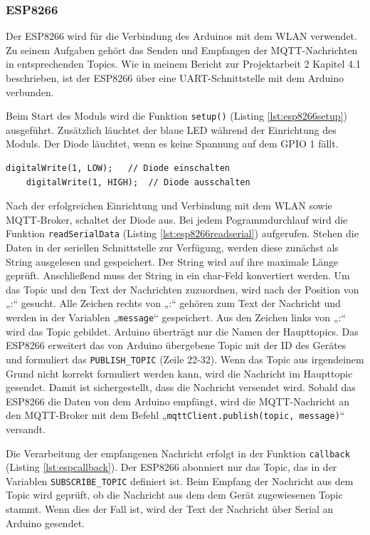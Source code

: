 \documentclass[12pt, letterpaper]{article}
\begin{document}
  \subsubsection{ESP8266}
  \par Der ESP8266 wird für die Verbindung des Arduinos mit dem WLAN verwendet. Zu seinem Aufgaben gehört das Senden und Empfangen der MQTT-Nachrichten in entsprechenden Topics. Wie in meinem Bericht zur Projektarbeit 2 \cite{pa2} Kapitel 4.1 beschrieben, ist der ESP8266 über eine UART-Schnittstelle mit dem Arduino verbunden.
  \par Beim Start des Moduls wird die Funktion \texttt{setup()} (Listing \ref{lst:esp8266setup}) ausgeführt. Zusätzlich läuchtet der blaue LED während der Einrichtung des Moduls. Der Diode läuchtet, wenn es keine Spannung auf dem GPIO 1 fällt.
  \begin{Verbatim}[frame=single]
    digitalWrite(1, LOW);   // Diode einschalten
    digitalWrite(1, HIGH);  // Diode ausschalten
  \end{Verbatim}
  \par Nach der erfolgreichen Einrichtung und Verbindung mit dem WLAN sowie MQTT-Broker, schaltet der Diode aus. Bei jedem Pogrammdurchlauf wird die Funktion \texttt{readSerialData} (Listing \ref{lst:esp8266readserial}) aufgerufen. Stehen die Daten in der seriellen Schnittstelle zur Verfügung, werden diese zunächst als String ausgelesen und gespeichert. Der String wird auf ihre maximale Länge geprüft. Anschließend muss der String in ein char-Feld konvertiert werden. Um das Topic und den Text der Nachrichten zuzuordnen, wird nach der Position von „:“ gesucht. Alle Zeichen rechts von „:“ gehören zum Text der Nachricht und werden in der Variablen „\texttt{message}“ gespeichert. Aus den Zeichen links von „:“ wird das Topic gebildet. Arduino überträgt nur die Namen der Haupttopics. Das ESP8266 erweitert das von Arduino übergebene Topic mit der ID des Gerätes und formuliert das \texttt{PUBLISH\_TOPIC} (Zeile 22-32). Wenn das Topic aus irgendeinem Grund nicht korrekt formuliert werden kann, wird die Nachricht im Haupttopic gesendet. Damit ist sichergestellt, dass die Nachricht versendet wird. Sobald das ESP8266 die Daten von dem Arduino empfängt, wird die MQTT-Nachricht an den MQTT-Broker mit dem Befehl „\texttt{mqttClient.publish(topic, message)}“ versandt.
  \par Die Verarbeitung der empfangenen Nachricht erfolgt in der Funktion \texttt{callback} (Listing \ref{lst:espcallback}). Der ESP8266 abonniert nur das Topic, das in der Variablen \texttt{SUBSCRIBE\_TOPIC} definiert ist. Beim Empfang der Nachricht aus dem Topic wird geprüft, ob die Nachricht aus dem dem Gerät zugewiesenen Topic stammt. Wenn dies der Fall ist, wird der Text der Nachricht über Serial an Arduino gesendet.
\end{document}
